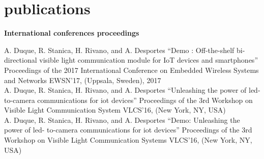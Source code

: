 \documentclass[]{cv-style}          %
\begin{document}
\section{publications}
 \vspace{-0.2cm}
\large{\textbf{International conferences proceedings}}

\normalsize
\begin{publist}
\pub
{A. Duque, R. Stanica, H. Rivano, and A. Desportes}
{“Demo : Off-the-shelf bi-directional visible light communication module for IoT devices and smartphones”}
{Proceedings of the 2017 International Conference on Embedded Wireless Systems and Networks}
{EWSN’17, (Uppsala, Sweden), 2017}\\
\pub
  {A. Duque, R. Stanica, H. Rivano, and A. Desportes}
  {“Unleashing the power of led- to-camera communications for iot devices”}
  {Proceedings of the 3rd Workshop on Visible Light Communication System}
  {VLCS’16, (New York, NY, USA)}\\
\pub
  {A. Duque, R. Stanica, H. Rivano, and A. Desportes} {“Demo: Unleashing the power of led- to-camera communications for iot devices”} {Proceedings of the 3rd Workshop on Visible Light Communication Systems} {VLCS’16, (New York, NY, USA)}

\end{publist}



\end{document}
